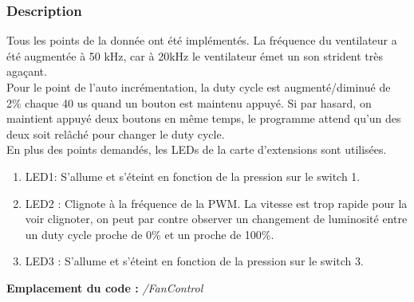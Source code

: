 \subsubsection{Description}
Tous les points de la donnée ont été implémentés. La fréquence du ventilateur a été augmentée à 50 kHz, car à 20kHz le ventilateur émet un son strident très agaçant.\\Pour le point de l'auto incrémentation, la duty cycle est augmenté/diminué de 2\% chaque 40 us quand un bouton est maintenu appuyé. Si par hasard, on maintient appuyé deux boutons en même temps, le programme attend qu'un des deux soit relâché pour changer le duty cycle.\\En plus des points demandés, les LEDs de la carte d'extensions sont utilisées.
\begin{enumerate}
	\item LED1: S'allume et s'éteint en fonction de la pression sur le switch 1.
	\item LED2 : Clignote à la fréquence de la PWM. La vitesse est trop rapide pour la voir clignoter, on peut par contre observer un changement de luminosité entre un duty cycle proche de 0\% et un proche de 100\%.
	\item LED3 : S'allume et s'éteint en fonction de la pression sur le switch 3.\\
\end{enumerate} 

\textbf{Emplacement du code : } \textit{/FanControl}

